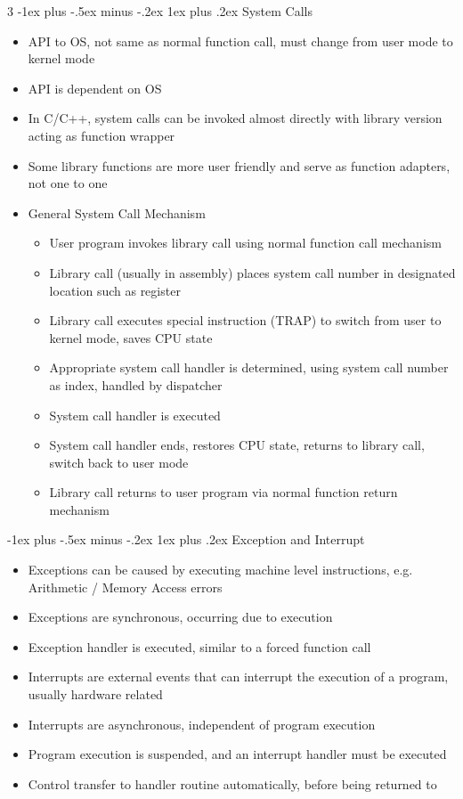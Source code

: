 \documentclass[10pt, landscape]{article}
\makeatletter
\renewcommand{\subsection}{\@startsection{subsection}{3}{0mm}%
                                {-1ex plus -.5ex minus -.2ex}%
                                {1ex plus .2ex}%
                                {\normalfont\small\bfseries}}%
\makeatother
\begin{document}
\begin{multicols*}{3}
\subsection{System Calls}
\begin{itemize}
    \item API to OS, not same as normal function call, must change from user mode to kernel mode
    \item API is dependent on OS
    \item In C/C++, system calls can be invoked almost directly with library version acting as function wrapper
    \item Some library functions are more user friendly and serve as function adapters, not one to one
    \item General System Call Mechanism
    \begin{itemize}
        \item User program invokes library call using normal function call mechanism
        \item Library call (usually in assembly) places system call number in designated location such as register
        \item Library call executes special instruction (TRAP) to switch from user to kernel mode, saves CPU state
        \item Appropriate system call handler is determined, using system call number as index, handled by dispatcher
        \item System call handler is executed
        \item System call handler ends, restores CPU state, returns to library call, switch back to user mode
        \item Library call returns to user program via normal function return mechanism
    \end{itemize}
\end{itemize}

\subsection{Exception and Interrupt}
\begin{itemize}
    \item Exceptions can be caused by executing machine level instructions, e.g. Arithmetic / Memory Access errors
    \item Exceptions are synchronous, occurring due to execution
    \item Exception handler is executed, similar to a forced function call
    \item Interrupts are external events that can interrupt the execution of a program, usually hardware related
    \item Interrupts are asynchronous, independent of program execution
    \item Program execution is suspended, and an interrupt handler must be executed
    \item Control transfer to handler routine automatically, before being returned to
\end{itemize}


\end{multicols*}
\end{document}
